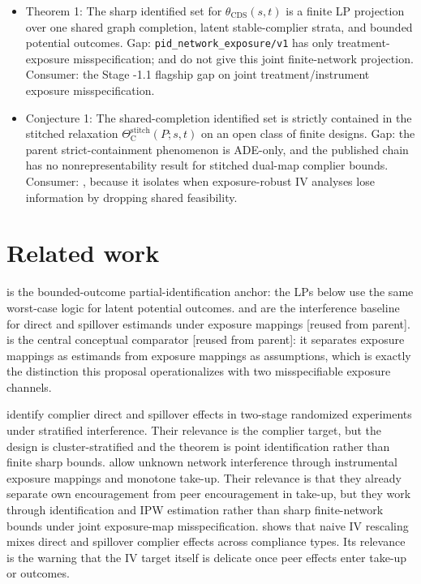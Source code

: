 \documentclass[11pt]{article}
\theoremstyle{definition}
\theoremstyle{plain}
\theoremstyle{remark}
\begin{document}
\begin{itemize}[leftmargin=*]
\item Theorem 1: The sharp identified set for \(\theta_{\mathrm{CDS}}(s,t)\) is a finite LP projection over one shared graph completion, latent stable-complier strata, and bounded potential outcomes. Gap: \texttt{pid\_network\_exposure/v1} has only treatment-exposure misspecification; \citet{hoshino_yanagi_2024_noncompliance_unknown_interference} and \citet{schroder_oprescu_feuerriegel_kallus_2026_networks_partialid} do not give this joint finite-network projection. Consumer: the Stage -1.1 flagship gap on joint treatment/instrument exposure misspecification.
\item Conjecture 1: The shared-completion identified set is strictly contained in the stitched relaxation \(\Theta_{\mathrm{C}}^{\mathrm{stitch}}(P;s,t)\) on an open class of finite designs. Gap: the parent strict-containment phenomenon is ADE-only, and the published chain has no nonrepresentability result for stitched dual-map complier bounds. Consumer: \citet{hoshino_yanagi_2024_noncompliance_unknown_interference}, because it isolates when exposure-robust IV analyses lose information by dropping shared feasibility.
\end{itemize}

\section{Related work}
\citet{manski_1990_nonparametric_bounds} is the bounded-outcome partial-identification anchor: the LPs below use the same worst-case logic for latent potential outcomes. \citet{hudgens_halloran_2008_interference} and \citet{aronow_samii_2017_general_interference} are the interference baseline for direct and spillover estimands under exposure mappings [reused from parent]. \citet{savje_2024_misspecified_exposure_mappings} is the central conceptual comparator [reused from parent]: it separates exposure mappings as estimands from exposure mappings as assumptions, which is exactly the distinction this proposal operationalizes with two misspecifiable exposure channels.

\citet{imai_jiang_malani_2021_interference_noncompliance} identify complier direct and spillover effects in two-stage randomized experiments under stratified interference. Their relevance is the complier target, but the design is cluster-stratified and the theorem is point identification rather than finite sharp bounds. \citet{hoshino_yanagi_2024_noncompliance_unknown_interference} allow unknown network interference through instrumental exposure mappings and monotone take-up. Their relevance is that they already separate own encouragement from peer encouragement in take-up, but they work through identification and IPW estimation rather than sharp finite-network bounds under joint exposure-map misspecification. \citet{vazquez_bare_2023_iv_spillovers} shows that naive IV rescaling mixes direct and spillover complier effects across compliance types. Its relevance is the warning that the IV target itself is delicate once peer effects enter take-up or outcomes.
\end{document}
